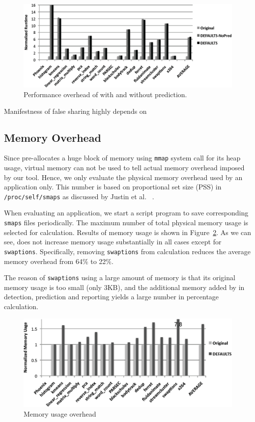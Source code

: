 \begin{figure}[!ht]
\begin{center}
\includegraphics[width=5in]{fig/perf}
\end{center}
\caption{
Performance overhead of  with and without prediction.
\label{fig:perf}}
\end{figure}

Manifestness of false sharing highly depends on 

\subsection{Memory Overhead}
\label{sec:memoverhead}
Since  pre-allocates a huge block of memory using \texttt{mmap} system call for 
its heap usage, 
virtual memory can not be used to tell actual memory overhead imposed by our tool. 
Hence, we only evaluate the physical memory overhead used by an application only. 
This number is based on proportional set size (PSS) in \texttt{/proc/self/smaps}
as discussed by Justin et al. ~\cite{memusage}. 

When evaluating an application, we start a script program to save 
corresponding \texttt{smaps} files periodically. 
The maximum number of total physical memory usage is selected for calculation.
Results of memory usage is shown in Figure~\ref{fig:memusage}. As we can see,
 does not increase memory usage substantially in all cases except for \texttt{swaptions}. 
Specifically, removing \texttt{swaptions} from calculation reduces 
the average memory overhead from 64\% to 22\%. 

The reason of \texttt{swaptions} using a large amount of memory is that 
its original memory usage is too small (only 3KB), and 
the additional memory added by  in detection, prediction and
reporting yields a large number in percentage calculation. 

\begin{figure}
\begin{center} 
\includegraphics[width=5in]{fig/memusage}
\end{center}
\caption{Memory usage overhead}
\label{fig:memusage}
\end{figure}


